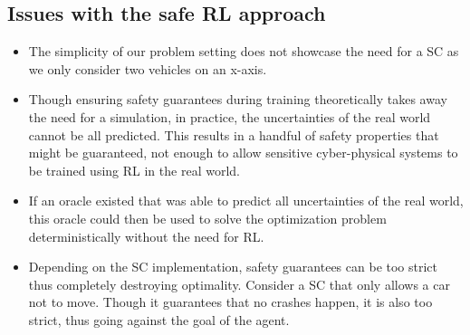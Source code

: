 \subsection{Issues with the safe RL approach}
\begin{itemize}
  \item The simplicity of our problem setting does not showcase the need for a SC as we only consider two vehicles on an x-axis. 
  \item Though ensuring safety guarantees during training theoretically takes away the need for a simulation, in practice, the uncertainties 
        of the real world cannot be all predicted. This results in a handful of safety properties that might be guaranteed, not enough to allow sensitive cyber-physical systems 
        to be trained using RL in the real world. 
  \item If an oracle existed that was able to predict all uncertainties of the real world, this oracle could then be used to solve the optimization problem 
        deterministically without the need for RL. 
  \item Depending on the SC implementation, safety guarantees can be too strict thus completely destroying optimality. Consider a SC that only allows a car not to move. 
        Though it guarantees that no crashes happen, it is also too strict, thus going against the goal of the agent. 
  
\end{itemize}


